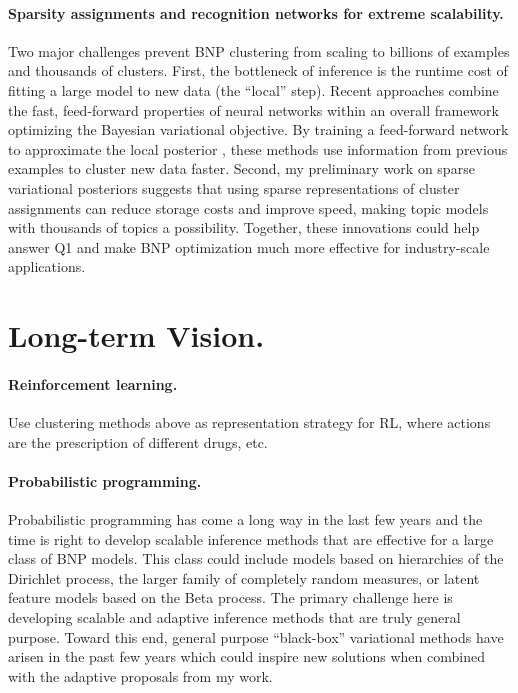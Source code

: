 \documentclass[11pt,letterpaper,sans]{article}
\begin{document}
\paragraph{Sparsity assignments and recognition networks for extreme scalability.}
Two major challenges prevent BNP clustering from scaling to billions of examples and thousands of clusters. First, the bottleneck of inference is the runtime cost of fitting a large model to new data (the ``local'' step). Recent approaches  \cite{mnih:neuralVariational} combine the fast, feed-forward properties of neural networks within an overall framework optimizing the Bayesian variational objective. By training a feed-forward network to approximate the local posterior \cite{gan:deepTSBN}, these methods use information from previous examples to cluster new data faster. 
Second, my preliminary work on sparse variational posteriors \citep{hughes2016sparse} suggests that using sparse representations of cluster assignments can reduce storage costs and improve speed, making topic models with thousands of topics a possibility. Together, these innovations could help answer Q1 and make BNP optimization much more effective for industry-scale applications.



\section{Long-term Vision.}
\paragraph{Reinforcement learning.}
Use clustering methods above as representation strategy for RL, where actions are the prescription of different drugs, etc. 



\paragraph{Probabilistic programming.}
Probabilistic programming has come a long way in the last few years and the time is right to develop scalable inference methods that are effective for a large class of BNP models. This class could include models based on hierarchies of the Dirichlet process, the larger family of completely random measures, or latent feature models based on the Beta process. The primary challenge here is developing scalable and adaptive inference methods that are truly general purpose. Toward this end, general purpose ``black-box'' variational methods \cite{kucukelbir:Stan, ranganath:blackbox} have arisen in the past few years which could inspire new solutions when combined with the adaptive proposals from my work.


\newpage


\end{document}
